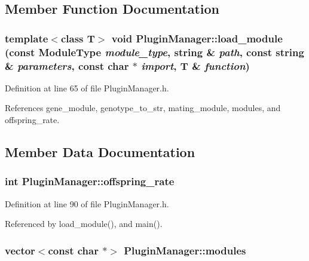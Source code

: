 \subsection{Member Function Documentation}
\hypertarget{classPluginManager_df498f0e9054ae03f78927510905ec55}{
\subsubsection{\setlength{\rightskip}{0pt plus 5cm}template$<$class T$>$ void PluginManager::load\_\-module (const {\bf ModuleType} {\em module\_\-type}, string \& {\em path}, const string \& {\em parameters}, const char $\ast$ {\em import}, T \& {\em function})}}
\label{classPluginManager_df498f0e9054ae03f78927510905ec55}




Definition at line 65 of file PluginManager.h.

References gene\_\-module, genotype\_\-to\_\-str, mating\_\-module, modules, and offspring\_\-rate.

\subsection{Member Data Documentation}
\hypertarget{classPluginManager_c09d5dee99948f43a349e4bcecfbe578}{
\subsubsection{\setlength{\rightskip}{0pt plus 5cm}int {\bf PluginManager::offspring\_\-rate}}}
\label{classPluginManager_c09d5dee99948f43a349e4bcecfbe578}




Definition at line 90 of file PluginManager.h.

Referenced by load\_\-module(), and main().\hypertarget{classPluginManager_f13751fb9b39023b1fd176768def6826}{
\subsubsection{\setlength{\rightskip}{0pt plus 5cm}vector$<$const char $\ast$$>$ {\bf PluginManager::modules}}}
\label{classPluginManager_f13751fb9b39023b1fd176768def6826}




